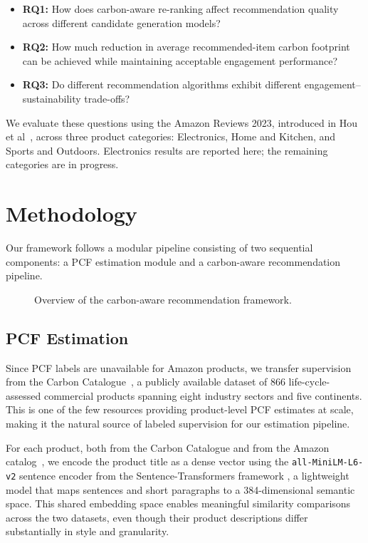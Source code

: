 \documentclass[11pt]{article}
\begin{document}
\begin{itemize}
  \item \textbf{RQ1:} How does carbon-aware re-ranking affect
    recommendation quality across different candidate generation models?
  \item \textbf{RQ2:} How much reduction in average recommended-item
    carbon footprint can be achieved while maintaining acceptable
    engagement performance?
  \item \textbf{RQ3:} Do different recommendation algorithms exhibit
    different engagement--sustainability trade-offs?
\end{itemize}

We evaluate these questions using the Amazon Reviews 2023, introduced in Hou et al~\cite{amazon2023}, across three product categories: Electronics,
Home and Kitchen, and Sports and Outdoors. Electronics results are
reported here; the remaining categories are in progress.

\section{Methodology}

Our framework follows a modular pipeline consisting of two sequential
components: a PCF estimation module and a carbon-aware recommendation
pipeline.

\begin{figure}[H]
  \centering
  \scalebox{0.78}{}
  \caption{Overview of the carbon-aware recommendation framework.}
  \label{fig:pipeline}
\end{figure}

\subsection{PCF Estimation}

Since PCF labels are unavailable for Amazon products, we transfer
supervision from the Carbon Catalogue~\cite{meinrenken2022carboncatalogue},
a publicly available dataset of 866 life-cycle-assessed commercial
products spanning eight industry sectors and five continents. This is one
of the few resources providing product-level PCF estimates at scale,
making it the natural source of labeled supervision for our estimation
pipeline.

For each product, both from the Carbon Catalogue and from the Amazon
catalog~\cite{amazon2023, amazon2015}, we encode the product title as a
dense vector using the \texttt{all-MiniLM-L6-v2} sentence encoder from the Sentence-Transformers framework \cite{reimers2019sbert}, a lightweight model that maps sentences
and short paragraphs to a 384-dimensional semantic space. This shared
embedding space enables meaningful similarity comparisons across the two
datasets, even though their product descriptions differ substantially in
style and granularity.
\end{document}
